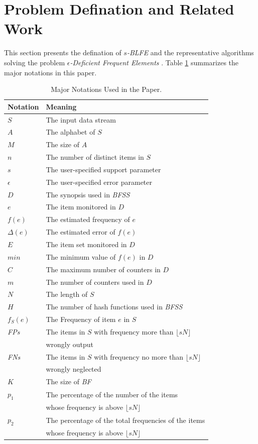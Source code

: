\documentclass[conference]{IEEEtran}
\begin{document}
\section{Problem Defination and Related Work}
This section presents the defination of \emph{$s$-BLFE} and the representative algorithms solving the problem \emph{$\epsilon$-Deficient Frequent Elements} \cite{IEEEexample:sticky}. Table \ref{tab:list} summarizes the major notations in this paper.

\begin{table}
	
    \caption{Major Notations Used in the Paper.}
   
	\begin{tabular}{ll}
		\hline	Notation  & Meaning\\ 
		\hline
		$S$ & The input data stream\\
		$A$ & The alphabet of $S$\\
		$M$ & The size of $A$\\
		$n$ & The number of distinct items in $S$\\
		$s$ & The user-specified support parameter\\
	    $\epsilon$ & The user-specified error parameter\\
		$D$ & The synopsis used in \emph{BFSS}\\
	    $e$ & The item monitored in $D$\\
	    $f(e)$ & The estimated frequency of $e$\\
	    $\Delta(e)$& The estimated error of $f(e)$\\
		$E$ & The item set monitored in $D$\\
		$min$ & The minimum value of $f(e)$ in $D$\\
		$C$ & The maximum number of counters in $D$\\
		$m$ & The number of counters used in $D$\\
		$N$ & The length of $S$\\
		$H$ & The number of hash functions used in \emph{BFSS}\\
		$f_S(e)$ & The Frequency of item $e$ in $S$\\ 
		\emph{FPs} &The items in $S$ with frequency more than $\lfloor sN\rfloor$\\& wrongly output\\
		\emph{FNs} & The items in $S$ with frequency no more than $\lfloor sN\rfloor$ \\&wrongly neglected\\
		$K$ & The size of \emph{BF}\\
		$p_1$ & The percentage of the number of the items \\&whose frequency is above $\lfloor sN\rfloor$\\
		$p_2$ & The percentage of the total frequencies of the items \\&whose frequency is above $\lfloor sN\rfloor$\\
       \hline
	\end{tabular}
\label{tab:list}

\end{table}
\end{document}
